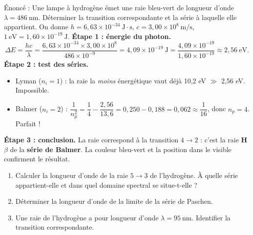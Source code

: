 \documentclass[11pt]{article}
\begin{document}
\begin{exoresolu}
Énoncé : Une lampe à hydrogène émet une raie bleu-vert de longueur d'onde $\lambda = 486\ \text{nm}$. Déterminer la transition correspondante et la série à laquelle elle appartient. On donne $h = 6{,}63\times 10^{-34}\ \text{J}\cdot\text{s}$, $c = 3{,}00\times 10^{8}\ \text{m/s}$, $1\ \text{eV} = 1{,}60\times 10^{-19}\ \text{J}$.
\tcblower
\textbf{Étape 1 : énergie du photon.}
\[ \Delta E = \frac{hc}{\lambda} = \frac{6{,}63\times 10^{-34}\times 3{,}00\times 10^{8}}{486\times 10^{-9}} = 4{,}09\times 10^{-19}\ \text{J} = \frac{4{,}09\times 10^{-19}}{1{,}60\times 10^{-19}} \approx 2{,}56\ \text{eV}. \]
\textbf{Étape 2 : test des séries.}
\begin{itemize}
\item Lyman ($n_i = 1$) : la raie la \emph{moins} énergétique vaut déjà 10,2 eV $\gg$ 2,56 eV. Impossible.
\item Balmer ($n_i = 2$) : $\dfrac{1}{n_p^2} = \dfrac{1}{4} - \dfrac{2{,}56}{13{,}6} = 0{,}250 - 0{,}188 = 0{,}062 \approx \dfrac{1}{16}$, donc $n_p = 4$. Parfait !
\end{itemize}
\textbf{Étape 3 : conclusion.} La raie correspond à la transition $4 \to 2$ : c'est la raie \textbf{H$\beta$} de la \textbf{série de Balmer}. La couleur bleu-vert et la position dans le visible confirment le résultat.
\end{exoresolu}

\begin{exercice}
\begin{enumerate}
\item Calculer la longueur d'onde de la raie $5 \to 3$ de l'hydrogène. À quelle série appartient-elle et dans quel domaine spectral se situe-t-elle ?
\item Déterminer la longueur d'onde de la limite de la série de Paschen.
\item Une raie de l'hydrogène a pour longueur d'onde $\lambda = 95\ \text{nm}$. Identifier la transition correspondante.
\end{enumerate}
\end{exercice}
\end{document}
